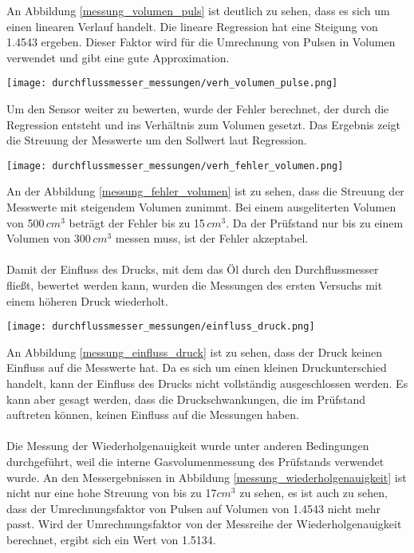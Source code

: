 An Abbildung \ref{messung_volumen_puls} ist deutlich zu sehen, dass es sich um einen linearen Verlauf handelt. Die lineare Regression hat eine Steigung von 1.4543 ergeben. Dieser Faktor wird für die Umrechnung von Pulsen in Volumen verwendet und gibt eine gute Approximation.
\begin{figure*}[h]
	\centering
	\texttt{[image: durchflussmesser\_messungen/verh\_volumen\_pulse.png]}
	\caption{Verhältnis von Volumen zur Pulszahl}
	\label{messung_volumen_puls}
\end{figure*}
\noindent
Um den Sensor weiter zu bewerten, wurde der Fehler berechnet, der durch die Regression entsteht und ins Verhältnis zum Volumen gesetzt. Das Ergebnis zeigt die Streuung der Messwerte um den Sollwert laut Regression.
\begin{figure*}[h]
	\centering
	\texttt{[image: durchflussmesser\_messungen/verh\_fehler\_volumen.png]}
	\caption{Verhältnis vom Fehler der Regression zum Volumen}
	\label{messung_fehler_volumen}
\end{figure*}
\noindent
An der Abbildung \ref{messung_fehler_volumen} ist zu sehen, dass die Streuung der Messwerte mit steigendem Volumen zunimmt. Bei einem ausgeliterten Volumen von 500\,\(cm^3\) beträgt der Fehler bis zu 15\,\(cm^3\). Da der Prüfstand nur bis zu einem Volumen von 300\,\(cm^3\) messen muss, ist der Fehler akzeptabel.
\\
\\
Damit der Einfluss des Drucks, mit dem das Öl durch den Durchflussmesser fließt, bewertet werden kann, wurden die Messungen des ersten Versuchs mit einem höheren Druck wiederholt.
\begin{figure*}[h]
	\centering
	\texttt{[image: durchflussmesser\_messungen/einfluss\_druck.png]}
	\caption{Der Einfluss von Druck auf Messung des Durchflussmessers}
	\label{messung_einfluss_druck}
\end{figure*}
\noindent
An Abbildung \ref{messung_einfluss_druck} ist zu sehen, dass der Druck keinen Einfluss auf die Messwerte hat. Da es sich um einen kleinen Druckunterschied handelt, kann der Einfluss des Drucks nicht vollständig ausgeschlossen werden. Es kann aber gesagt werden, dass die Druckschwankungen, die im Prüfstand auftreten können, keinen Einfluss auf die Messungen haben.
\\
\\
Die Messung der Wiederholgenauigkeit wurde unter anderen Bedingungen durchgeführt, weil die interne Gasvolumenmessung des Prüfstands verwendet wurde. An den Messergebnissen in Abbildung \ref{messung_wiederholgenauigkeit} ist nicht nur eine hohe Streuung von bis zu 17\(cm^3\) zu sehen, es ist auch zu sehen, dass der Umrechnungsfaktor von Pulsen auf Volumen von 1.4543 nicht mehr passt. Wird der Umrechnungsfaktor von der Messreihe der Wiederholgenauigkeit berechnet, ergibt sich ein Wert von 1.5134.
